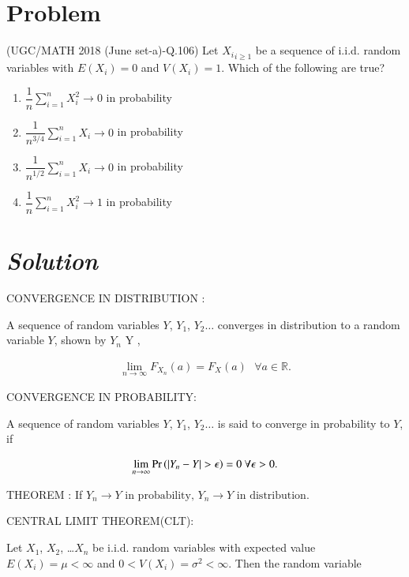 \documentclass[journal,12pt,twocolumn]{IEEEtran}
\begin{document}
\section{Problem}
(UGC/MATH 2018 (June set-a)-Q.106) Let ${X_i}_{i \geq 1}$ be a sequence of i.i.d. random variables with $E(X_i)=0$ and $V(X_i)=1$. Which of the following are true?
\vspace{0.2cm}
\begin{enumerate}
    \item $\dfrac{1}{n} \sum_{i=1}^n X_i^2 \to 0$ in probability 
    \item $\dfrac{1}{n^{3/4}} \sum_{i=1}^n X_i \to 0$ in probability 
    \item $\dfrac{1}{n^{1/2}} \sum_{i=1}^n X_i \to 0$ in probability 
    \item $\dfrac{1}{n} \sum_{i=1}^n X_i^2 \to 1$ in probability
\end{enumerate}

\section*{\emph{Solution}}
CONVERGENCE IN DISTRIBUTION :

A sequence of random variables $Y$, $Y_1$, $Y_2 \ldots$   converges in distribution to a random variable $Y$, shown by {$Y_n$} \to Y , 

\begin{align}
    \lim_{n \to \infty}F_{X_{n}} (a) = F_{X} (a)  \text{  }\forall a \in \mathbb{R}.
\end{align}

CONVERGENCE IN PROBABILITY:

A sequence of random variables $Y$, $Y_1$, $Y_2 \ldots$ is said to converge in probability to $Y$, if

\begin{align}
    \lim_{n \to \infty}\Pr\left(\vert Y_n - Y\vert > \epsilon\right) = 0  \text{  }\forall \epsilon > 0.
\end{align}




THEOREM : 
If
\begin{math}
 {Y_n} \to Y \text{ in probability, }{Y_n} \to Y \text{ in distribution.}
\end{math}



CENTRAL LIMIT THEOREM(CLT):

Let $X_1$, $X_2$, \ldots $X_n$ be i.i.d. random variables with expected value $E(X_i)=\mu < \infty$  and $0 < V(X_i)=\sigma^2 < \infty$. Then the random variable 
\end{document}
